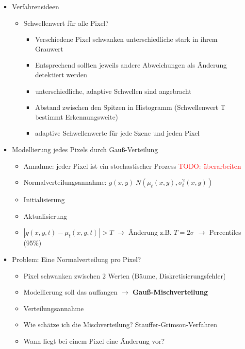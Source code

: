 \documentclass{report}
\newcommand{\todo}[2][red]{\textcolor{#1}{TODO: #2}}
\begin{document}
\begin{itemize}
		\item Verfahrensideen
		\begin{itemize}
			\item Schwellenwert für alle Pixel?
			\begin{itemize}
				\item Verschiedene Pixel schwanken unterschiedliche stark in ihrem Grauwert
				\item Entsprechend sollten jeweils andere Abweichungen als Änderung detektiert werden
				\item unterschiedliche, adaptive Schwellen sind angebracht
				\newline
				\item Abstand zwischen den Spitzen in Histogramm (Schwellenwert T bestimmt Erkennungsweite)
				\item adaptive Schwellenwerte für jede Szene und jeden Pixel
			\end{itemize}
		\end{itemize}
	
		\item Modellierung jedes Pixels durch Gauß-Verteilung
		\begin{itemize}
			\item Annahme: jeder Pixel ist ein stochastischer Prozess
			\todo{überarbeiten}
			\item Normalverteilungsannahme: $g(x, y) ~ N(\mu_t(x, y), \sigma_t^2 (x, y))$
			\item Initialisierung
			\item Aktualisierung
			\item $|g(x,y,t) - \mu_t(x,y,t)| > T$ $\rightarrow$ Änderung
			\newline z.B. $T = 2 \sigma$ $\rightarrow$ Percentiles (95\%)
		\end{itemize}
	
		\item Problem: Eine Normalverteilung pro Pixel?
		\begin{itemize}
			\item Pixel schwanken zwischen 2 Werten (Bäume, Diskretisierungsfehler)
			\item Modellierung soll das auffangen $\rightarrow$ \textbf{Gauß-Mischverteilung}
			\item Verteilungsannahme
			\newline
			\item Wie schätze ich die Mischverteilung?
			\newline Stauffer-Grimson-Verfahren
			\item Wann liegt bei einem Pixel eine Änderung vor?
		\end{itemize}
	

\end{itemize}
\end{document}
